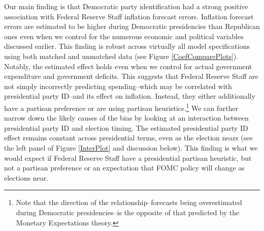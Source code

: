 \documentclass[a4paper]{article}\usepackage{graphicx, color}
\begin{document}
Our main finding is that Democratic party identification had a strong positive association with Federal Reserve Staff inflation forecast errors. Inflation forecast errors are estimated to be higher during Democratic presidencies than Republican ones even when we control for the numerous economic and political variables discussed earlier. This finding is robust across virtually all model specifications using both matched and unmatched data (see Figure \ref{CoefComparePlots}). Notably, the estimated effect holds even when we control for actual government expenditure and government deficits. This suggests that Federal Reserve Staff are not simply incorrectly predicting spending--which may be correlated with presidential party ID--and its effect on inflation. Instead, they either additionally have a partisan preference or are using partisan heuristics.\footnote{Note that the direction of the relationship--forecasts being overestimated during Democratic presidencies--is the opposite of that predicted by the Monetary Expectations theory.} We can further narrow down the likely causes of the bias by looking at an interaction between presidential party ID and election timing. The estimated presidential party ID effect remains constant across presidential terms, even as the election nears (see the left panel of Figure \ref{InterPlot} and discussion below). This finding is what we would expect if Federal Reserve Staff have a presidential partisan heuristic, but not a partisan preference or an expectation that FOMC policy will change as elections near.
\end{document}
